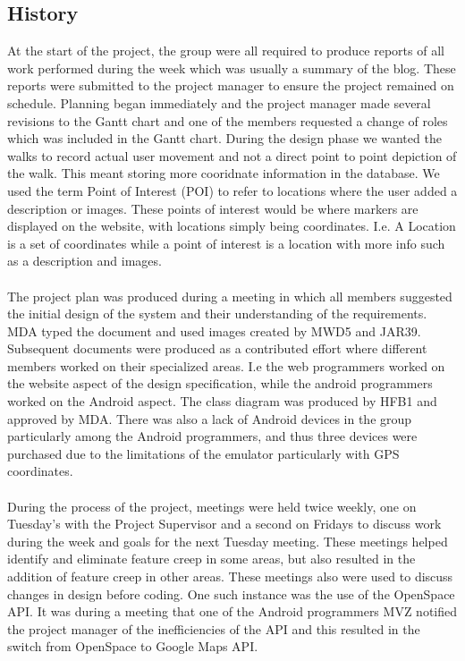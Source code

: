 \documentclass[12pt]{article}
\begin{document}
\subsection{History}
At the start of the project, the group were all required to produce reports of all work performed during the week which was usually a summary of the blog. These reports were submitted to the project manager to ensure the project remained on schedule. Planning began immediately and the project manager made several revisions to the Gantt chart and one of the members requested a change of roles which was included in the Gantt chart. During the design phase we wanted the walks to record actual user movement and not a direct point to point depiction of the walk. This meant storing more cooridnate information in the database. We used the term Point of Interest (POI) to refer to locations where the user added a description or images. These points of interest would be where markers are displayed on the website, with locations simply being coordinates. I.e. A Location is a set of coordinates while a point of interest is a location with more info such as a description and images.
\\\\
The project plan was produced during a meeting in which all members suggested the initial design of the system and their understanding of the requirements. MDA typed the document and used images created by MWD5 and JAR39. Subsequent documents were produced as a contributed effort where different members worked on their specialized areas. I.e the web programmers worked on the website aspect of the design specification, while the android programmers worked on the Android aspect. The class diagram was produced by HFB1 and approved by MDA. There was also a lack of Android devices in the group particularly among the Android programmers, and thus three devices were purchased due to the limitations of the emulator particularly with GPS coordinates.
\\\\
During the process of the project, meetings were held twice weekly, one on Tuesday's with the Project Supervisor and a second on Fridays to discuss work during the week and goals for the next Tuesday meeting. These meetings helped identify and eliminate feature creep in some areas, but also resulted in the addition of feature creep in other areas. These meetings also were used to discuss changes in design before coding. One such instance was the use of the OpenSpace API. It was during a meeting that one of the Android programmers MVZ notified the project manager of the inefficiencies of the API and this resulted in the switch from OpenSpace to Google Maps API.
\end{document}
